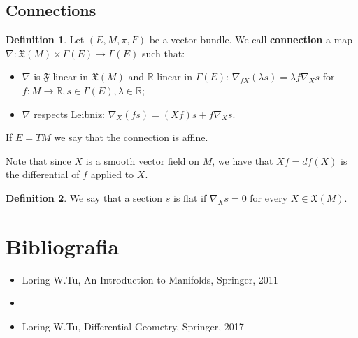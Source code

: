 \documentclass[12pt,a4paper]{report}
\theoremstyle{definition}
\newtheorem{Def}{Definition}[chapter]
\theoremstyle{Theorem}
\theoremstyle{definition}
\theoremstyle{definition}
\begin{document}
	\section{Connections}
	\begin{Def}\label{Def_5.7}
		Let $(E,M,\pi,F)$ be a vector bundle. We call \textbf{connection} a map $\nabla:\mathfrak{X}(M)\times\Gamma(E)\rightarrow\Gamma(E)$ such that:
		\begin{itemize}
			\item $\nabla$ is $\mathfrak{F}$-linear in $\mathfrak{X}(M)$ and $\mathbb{R}$ linear in $\Gamma(E)$: $\nabla_{fX}(\lambda s)=\lambda f\nabla_X s$ for $f:M\rightarrow \mathbb{R}, s\in\Gamma(E),\lambda\in\mathbb{R}$;
			\item $\nabla$ respects Leibniz: $\nabla_X (fs)=(Xf)s+f\nabla_X s$.
		\end{itemize}
		If $E=TM$ we say that the connection is affine.
	\end{Def}
	Note that since $X$ is a smooth vector field on $M$, we have that $Xf=df(X)$ is the differential of $f$ applied to $X$.
	\begin{Def}\label{Def_5.8}
		We say that a section $s$ is flat if $\nabla_X s=0$ for every $X\in \mathfrak{X}(M)$.
	\end{Def}
\chapter*{Bibliografia}
\begin{itemize}
	\item[$\circ$] [1] Loring W.Tu, An Introduction to Manifolds, Springer, 2011
	\item 	\item[$\circ$] [2] Loring W.Tu, Differential Geometry, Springer, 2017
\end{itemize}
\end{document}
